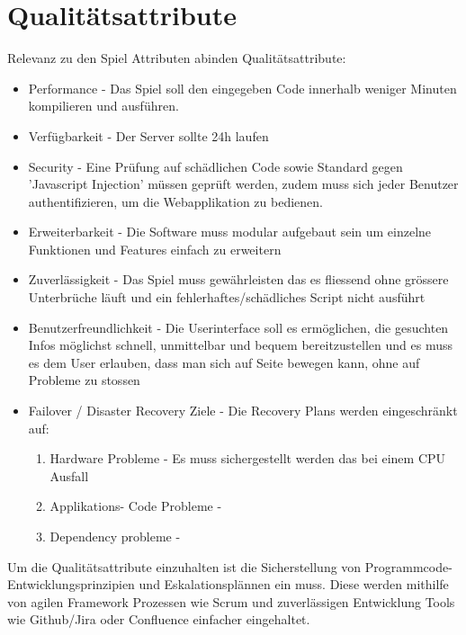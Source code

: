 \documentclass[a4paper, 11pt]{scrartcl}
\let\oldsection\section
\renewcommand\section{\clearpage\oldsection}
\begin{document}
\section{Qualitätsattribute}

Relevanz zu den Spiel Attributen abinden
Qualitätsattribute:
\begin{itemize}

\item Performance - Das Spiel soll den eingegeben Code innerhalb weniger Minuten kompilieren und ausführen.
\item Verfügbarkeit - Der Server sollte 24h laufen
\item Security - Eine Prüfung auf schädlichen Code sowie Standard gegen 'Javascript Injection' müssen geprüft werden, zudem muss sich jeder Benutzer authentifizieren, um die Webapplikation zu bedienen.
\item Erweiterbarkeit - Die Software muss modular aufgebaut sein um einzelne Funktionen und Features einfach zu erweitern
\item Zuverlässigkeit - Das Spiel muss gewährleisten das es fliessend ohne grössere Unterbrüche läuft und ein fehlerhaftes/schädliches Script nicht ausführt
\item Benutzerfreundlichkeit - Die Userinterface soll es ermöglichen, die gesuchten Infos möglichst schnell, unmittelbar und bequem bereitzustellen und es muss es dem User erlauben, dass man sich auf Seite bewegen kann, ohne auf Probleme zu stossen
\item Failover / Disaster Recovery Ziele - Die Recovery Plans werden eingeschränkt auf:
\begin{enumerate}
\item Hardware Probleme - Es muss sichergestellt werden das bei einem CPU Ausfall
\item Applikations- Code Probleme -
\item Dependency probleme -
\end{enumerate}

\end{itemize}

Um die Qualitätsattribute einzuhalten ist die Sicherstellung von Programmcode-Entwicklungsprinzipien und Eskalationsplännen ein muss. Diese werden mithilfe
von agilen Framework Prozessen wie Scrum und zuverlässigen Entwicklung Tools wie Github/Jira oder Confluence einfacher eingehaltet.
\end{document}
